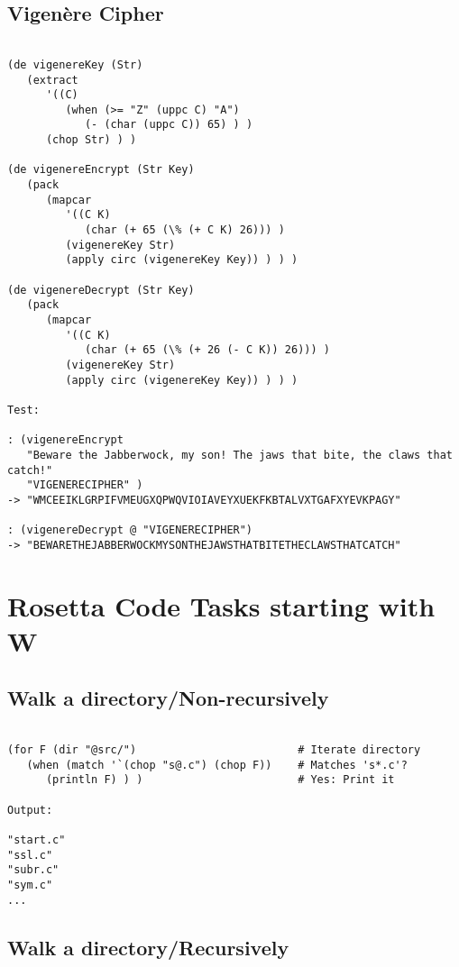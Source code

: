\section*{Vigenère Cipher}

\begin{verbatim}

(de vigenereKey (Str)
   (extract
      '((C)
         (when (>= "Z" (uppc C) "A")
            (- (char (uppc C)) 65) ) )
      (chop Str) ) )

(de vigenereEncrypt (Str Key)
   (pack
      (mapcar
         '((C K)
            (char (+ 65 (\% (+ C K) 26))) )
         (vigenereKey Str)
         (apply circ (vigenereKey Key)) ) ) )

(de vigenereDecrypt (Str Key)
   (pack
      (mapcar
         '((C K)
            (char (+ 65 (\% (+ 26 (- C K)) 26))) )
         (vigenereKey Str)
         (apply circ (vigenereKey Key)) ) ) )

Test:

: (vigenereEncrypt
   "Beware the Jabberwock, my son! The jaws that bite, the claws that catch!"
   "VIGENERECIPHER" )
-> "WMCEEIKLGRPIFVMEUGXQPWQVIOIAVEYXUEKFKBTALVXTGAFXYEVKPAGY"

: (vigenereDecrypt @ "VIGENERECIPHER")
-> "BEWARETHEJABBERWOCKMYSONTHEJAWSTHATBITETHECLAWSTHATCATCH"

\end{verbatim}

\chapter{Rosetta Code Tasks starting with W}

\section*{Walk a directory/Non-recursively}

\begin{verbatim}

(for F (dir "@src/")                         # Iterate directory
   (when (match '`(chop "s@.c") (chop F))    # Matches 's*.c'?
      (println F) ) )                        # Yes: Print it

Output:

"start.c"
"ssl.c"
"subr.c"
"sym.c"
...

\end{verbatim}

\section*{Walk a directory/Recursively}

